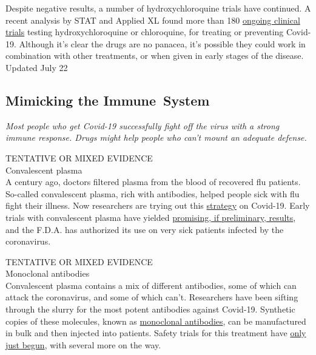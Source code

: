 Despite negative results, a number of hydroxychloroquine trials have
continued. A recent analysis by STAT and Applied XL found more than 180
\href{https://www.statnews.com/2020/07/06/data-show-panic-and-disorganization-dominate-the-study-of-covid-19-drugs/}{ongoing
clinical trials} testing hydroxychloroquine or chloroquine, for treating
or preventing Covid-19. Although it's clear the drugs are no panacea,
it's possible they could work in combination with other treatments, or
when given in early stages of the disease.\\
Updated July 22

\hypertarget{mimicking-the-immune-system}{%
\subsection{Mimicking the
Immune~System}\label{mimicking-the-immune-system}}

\emph{Most people who get Covid-19 successfully fight off the virus with
a strong immune response. Drugs might help people who can't mount an
adequate defense.}

TENTATIVE OR MIXED EVIDENCE\\
Convalescent plasma\\
A century ago, doctors filtered plasma from the blood of recovered flu
patients. So-called convalescent plasma, rich with antibodies, helped
people sick with flu fight their illness. Now researchers are trying out
this
\href{https://www.nytimes3xbfgragh.onion/2020/04/24/smarter-living/coronavirus-convalescent-plasma-antibodies.html?searchResultPosition=1}{strategy}
on Covid-19. Early trials with convalescent plasma have yielded
\href{https://www.nytimes3xbfgragh.onion/2020/05/22/health/coronarvirus-convalescent-serum.html?searchResultPosition=2}{promising,
if preliminary, results}, and the F.D.A. has authorized its use on very
sick patients infected by the coronavirus.

TENTATIVE OR MIXED EVIDENCE\\
Monoclonal antibodies\\
Convalescent plasma contains a mix of different antibodies, some of
which can attack the coronavirus, and some of which can't. Researchers
have been sifting through the slurry for the most potent antibodies
against Covid-19. Synthetic copies of these molecules, known as
\href{https://www.nytimes3xbfgragh.onion/2020/07/09/health/regeneron-monoclonal-antibodies.html}{monoclonal
antibodies}, can be manufactured in bulk and then injected into
patients. Safety trials for this treatment have
\href{https://investor.lilly.com/news-releases/news-release-details/lilly-begins-worlds-first-study-potential-covid-19-antibody}{only
just begun}, with several more on the way.

